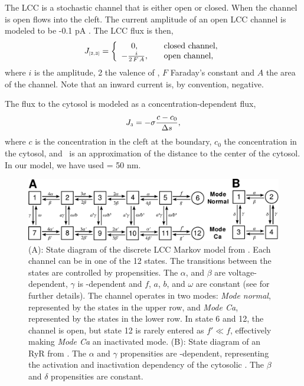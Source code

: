 The LCC is a stochastic channel that is either open or closed. When
the channel is open \Ca flows into the cleft. The current amplitude
of an open LCC channel is modeled to be -0.1 pA
\citep{GuiaSternLakattaEtAl2001}. The LCC flux is then,
\begin{equation}
\label{eq:hake:constant-current-flux}
J_{\scriptscriptstyle[2,3]}= \left\{
  \begin{array}{c@{\quad\quad}l}
    0,& \text{closed channel},\\
    - \frac{i}{2\,F\,A},& \text{open channel},
  \end{array}
\right.
\end{equation}
\noindent where $i$ is the amplitude, 2 the valence of \Ca, $F$
Faraday's constant and $A$ the area of the channel. Note that an
inward current is, by convention, negative.

The flux to the cytosol is modeled as a concentration-dependent flux,
\begin{equation}
  \label{eq:hake:conc-dependent-flux}
  J_{\scriptscriptstyle 3}= -\sigma\frac{c - c_0}{\Delta{}s},
\end{equation}
where $c$ is the concentration in the cleft at the boundary, $c_0$ the
concentration in the cytosol, and \Ds~is an approximation of the
distance to the center of the cytosol. In our model, we have used \Ds
= 50 nm.

\begin{figure}
  \centering
  \includegraphics[height=\largefig]{chapters/hake/pdf/markov_models}
  \caption[Discrete markov models]{(A): State diagram of the
    discrete LCC Markov model from \citet{JafriRiceWinslow1998}. Each
    channel can be in one of the 12 states.  The transitions between
    the states are controlled by propensities. The $\alpha$, and
    $\beta$ are voltage-dependent, $\gamma$ is \CaC-dependent and $f$,
    $a$, $b$, and $\omega$ are constant (see
    \citet{JafriRiceWinslow1998} for further details). The channel
    operates in two modes: \textit{Mode normal}, represented by the
    states in the upper row, and \textit{Mode Ca}, represented by the
    states in the lower row. In state 6 and 12, the channel is open,
    but state 12 is rarely entered as $f'\ll{}f$, effectively making
    \textit{Mode Ca} an inactivated mode. (B): State diagram
    of an RyR from \citet{SternSongEtAl1999}. The $\alpha$ and
    $\gamma$ propensities are \Ca-dependent, representing the
    activation and inactivation dependency of the cytosolic \CaC. The
    $\beta$ and $\delta$ propensities are constant.}
  \label{fig:hake:markov-models}
\end{figure}

